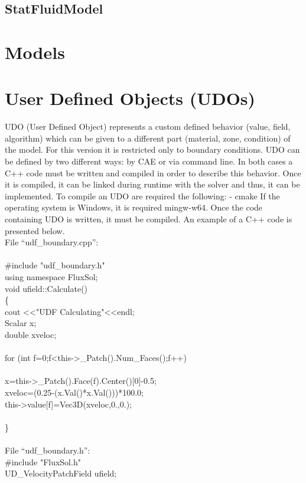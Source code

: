 \documentclass{article}     %
\begin{document}
\subsection{StatFluidModel}
\section{Models}

\section{User Defined Objects (UDOs)}
UDO (User Defined Object) represents a custom defined  behavior (value, field, algorithm) which can be given to a different part (material, zone, condition) of the model. For this version it is restricted only to boundary conditions. UDO can be defined by two different ways: by CAE or via command line. In both cases a C++ code must be written and compiled in order to describe this behavior. Once it is compiled, it can be linked during runtime with the solver and thus, it can be implemented. 
To compile an UDO are required the following:
- cmake
If the operating system is Windows, it is required mingw-w64.
Once the code containing UDO is written, it must be compiled. 
An example of a C++ code is presented below. \\
File “udf\_boundary.cpp”:\\
\\
\#include "udf\_boundary.h"\\
using namespace FluxSol;\\
void ufield::Calculate()\\
\{
\\
    cout \textless\textless "UDF Calculating"\textless\textless endl;\\
	Scalar x;\\
	double xveloc;\\
\\
	for (int f=0;f<this-\textgreater\_Patch().Num\_Faces();f++)\\
	\\
		x=this-\textgreater\_Patch().Face(f).Center()[0]-0.5;\\
		xveloc=(0.25-(x.Val()*x.Val()))*100.0;\\
		this-\textgreater value[f]=Vec3D(xveloc,0.,0.);\\
	\\
\}\\ \\
File “udf\_boundary.h”:\\
\#include "FluxSol.h"\\
UD\_VelocityPatchField ufield;\\
\end{document}
